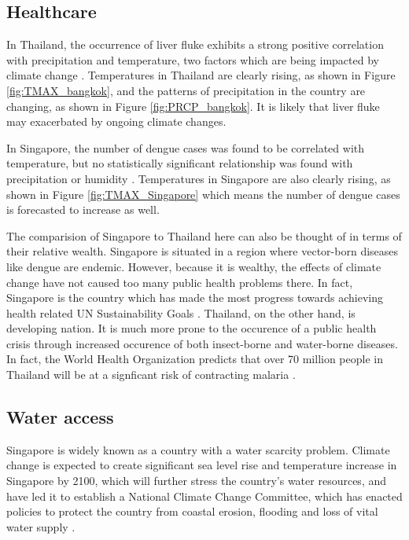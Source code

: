 \subsection{Healthcare}

In Thailand, the occurrence of liver fluke exhibits a strong positive correlation with precipitation and temperature, two factors which are being impacted by climate change \citep{liverfluke}. Temperatures in Thailand are clearly rising, as shown in Figure \ref{fig:TMAX_bangkok}, and the patterns of precipitation in the country are changing, as shown in Figure \ref{fig:PRCP_bangkok}. It is likely that liver fluke may exacerbated by ongoing climate changes.

In Singapore, the number of dengue cases was found to be correlated with temperature, but no statistically significant relationship was found with precipitation or humidity \citep{singaporedengue}. Temperatures in Singapore are also clearly rising, as shown in Figure \ref{fig:TMAX_Singapore} which means the number of dengue cases is forecasted to increase as well.

The comparision of Singapore to Thailand here can also be thought of in terms of their relative wealth. Singapore is situated in a region where vector-born diseases like dengue are endemic. However, because it is wealthy, the effects of climate change have not caused too many public health problems there. In fact, Singapore is the country which has made the most progress towards achieving health related UN Sustainability Goals \citep{sinagaporeclimatechange}. Thailand, on the other hand, is developing nation. It is much more prone to the occurence of a public health crisis through increased occurence of both insect-borne and water-borne diseases. In fact, the World Health Organization predicts that over 70 million people in Thailand will be at a signficant risk of contracting malaria \citep{borgen}.

\subsection{Water access}

Singapore is widely known as a country with a water scarcity problem. Climate change is expected to create significant sea level rise and temperature increase in Singapore by 2100, which will further stress the country's water resources, and have led it to establish a National Climate Change Committee, which has enacted policies to protect the country from coastal erosion, flooding and loss of vital water supply \citep{bhullar2013climate}. 

